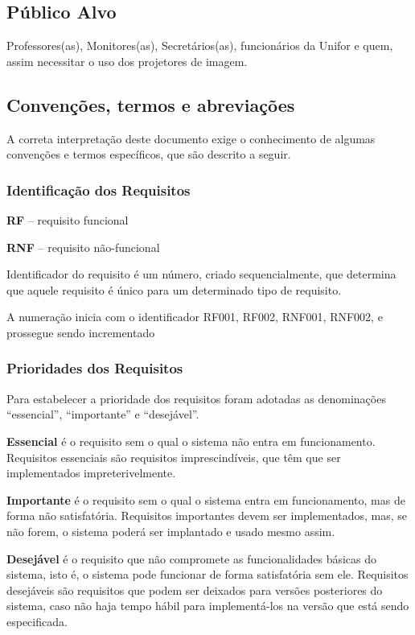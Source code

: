\subsection{Público Alvo}

Professores(as), Monitores(as), Secretários(as), funcionários da Unifor 
e quem, assim necessitar o uso dos projetores de imagem.

\subsection{Convenções, termos e abreviações}

A correta interpretação deste documento exige o conhecimento de algumas 
convenções e termos específicos, que são descrito a seguir.


\subsubsection{Identificação dos Requisitos} 
\hspace{1.0cm}
  \textbf{RF} – requisito funcional

  \textbf{RNF} – requisito não-funcional

Identificador do requisito é um número, criado sequencialmente, que
determina que aquele requisito é único para um determinado tipo de 
requisito. 

A numeração inicia com o identificador RF001, RF002, RNF001, RNF002, e prossegue 
sendo incrementado 

\subsubsection{Prioridades dos Requisitos}

Para estabelecer a prioridade dos requisitos foram adotadas as 
denominações “essencial”, “importante” e “desejável”. 

\textbf{Essencial} é o requisito sem o qual o sistema não entra em 
funcionamento. Requisitos essenciais são requisitos imprescindíveis, 
que têm que ser implementados impreterivelmente.

\textbf{Importante} é o requisito sem o qual o sistema entra em 
funcionamento, mas de forma não satisfatória. Requisitos importantes 
devem ser implementados, mas, se não forem, o sistema poderá ser 
implantado e usado mesmo assim.

\textbf{Desejável} é o requisito que não compromete as funcionalidades 
básicas do sistema, isto é, o sistema pode funcionar de forma 
satisfatória sem ele. Requisitos desejáveis são requisitos que podem 
ser deixados para versões posteriores do sistema, caso não haja tempo 
hábil para implementá-los na versão que está sendo especificada.


